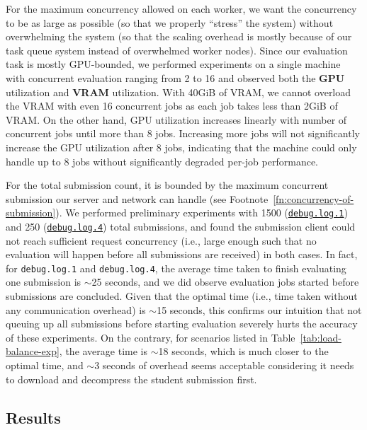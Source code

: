 For the maximum concurrency allowed on each worker, we want the concurrency to be as large as possible (so that we properly ``stress'' the system) without overwhelming the system (so that the scaling overhead is mostly because of our task queue system instead of overwhelmed worker nodes). Since our evaluation task is mostly GPU-bounded, we performed experiments on a single machine with concurrent evaluation ranging from 2 to 16 and observed both the \textbf{GPU} utilization and \textbf{VRAM} utilization. With 40GiB of VRAM, we cannot overload the VRAM with even 16 concurrent jobs as each job takes less than 2GiB of VRAM. On the other hand, GPU utilization increases linearly with number of concurrent jobs until more than 8 jobs. Increasing more jobs will not significantly increase the GPU utilization after 8 jobs, indicating that the machine could only handle up to 8 jobs without significantly degraded per-job performance.

For the total submission count, it is bounded by the maximum concurrent submission our server and network can handle (see Footnote~\ref{fn:concurrency-of-submission}). We performed preliminary experiments with 1500 (\href{https://github.com/edu-ai/aivle-experiment-logs/blob/main/web/debug.log.1}{\texttt{debug.log.1}}) and 250 (\href{https://github.com/edu-ai/aivle-experiment-logs/blob/main/web/debug.log.4}{\texttt{debug.log.4}}) total submissions, and found the submission client could not reach sufficient request concurrency (i.e., large enough such that no evaluation will happen before all submissions are received) in both cases. In fact, for \texttt{debug.log.1} and \texttt{debug.log.4}, the average time taken to finish evaluating one submission is $\sim$25 seconds, and we did observe evaluation jobs started before submissions are concluded. Given that the optimal time (i.e., time taken without any communication overhead) is $\sim$15 seconds, this confirms our intuition that not queuing up all submissions before starting evaluation severely hurts the accuracy of these experiments. On the contrary, for scenarios listed in Table~\ref{tab:load-balance-exp}, the average time is $\sim$18 seconds, which is much closer to the optimal time, and $\sim$3 seconds of overhead seems acceptable considering it needs to download and decompress the student submission first.

\subsection{Results}
\label{ss:load-balancing-exp-results}

